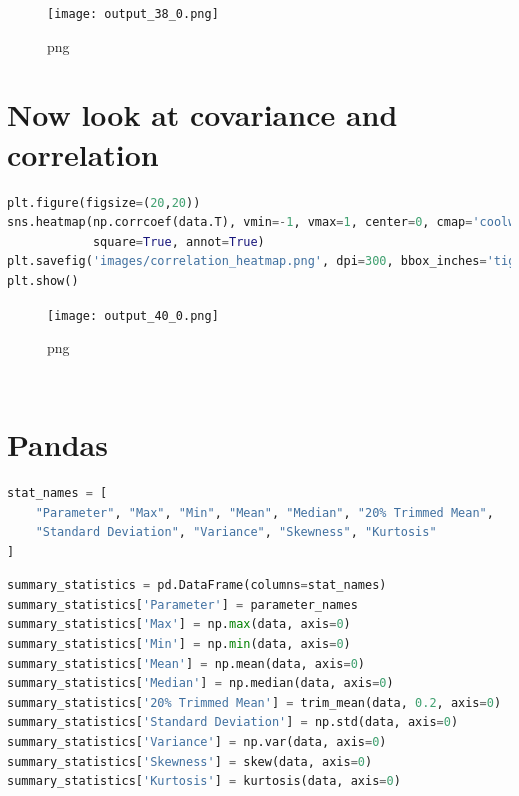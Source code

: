 \begin{figure}
\centering
\texttt{[image: output\_38\_0.png]}
\caption{png}
\end{figure}

\hypertarget{now-look-at-covariance-and-correlation}{%
\section{Now look at covariance and
correlation}\label{now-look-at-covariance-and-correlation}}

\begin{lstlisting}[language=Python]
plt.figure(figsize=(20,20))
sns.heatmap(np.corrcoef(data.T), vmin=-1, vmax=1, center=0, cmap='coolwarm',
            square=True, annot=True)
plt.savefig('images/correlation_heatmap.png', dpi=300, bbox_inches='tight')
plt.show()
\end{lstlisting}

\begin{figure}
\centering
\texttt{[image: output\_40\_0.png]}
\caption{png}
\end{figure}

\begin{lstlisting}[language=Python]
\end{lstlisting}

\begin{lstlisting}[language=Python]
\end{lstlisting}

\hypertarget{pandas}{%
\section{Pandas}\label{pandas}}

\begin{lstlisting}[language=Python]
stat_names = [
    "Parameter", "Max", "Min", "Mean", "Median", "20% Trimmed Mean",
    "Standard Deviation", "Variance", "Skewness", "Kurtosis"
]
\end{lstlisting}

\begin{lstlisting}[language=Python]
summary_statistics = pd.DataFrame(columns=stat_names)
summary_statistics['Parameter'] = parameter_names
summary_statistics['Max'] = np.max(data, axis=0)
summary_statistics['Min'] = np.min(data, axis=0)
summary_statistics['Mean'] = np.mean(data, axis=0)
summary_statistics['Median'] = np.median(data, axis=0)
summary_statistics['20% Trimmed Mean'] = trim_mean(data, 0.2, axis=0)
summary_statistics['Standard Deviation'] = np.std(data, axis=0)
summary_statistics['Variance'] = np.var(data, axis=0)
summary_statistics['Skewness'] = skew(data, axis=0)
summary_statistics['Kurtosis'] = kurtosis(data, axis=0)
\end{lstlisting}

